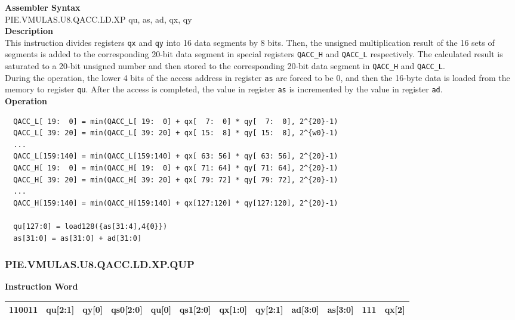 \textbf{Assembler Syntax} \\
PIE.VMULAS.U8.QACC.LD.XP qu, as, ad, qx, qy \\
\textbf{Description} \\
This instruction divides registers \lstinline{qx} and \lstinline{qy} into 16 data segments by 8 bits. Then, the unsigned multiplication result of the 16 sets of segments is added to the corresponding 20-bit data segment in special registers \lstinline{QACC_H} and \lstinline{QACC_L} respectively. The calculated result is saturated to a 20-bit unsigned number and then stored to the corresponding 20-bit data segment in \lstinline{QACC_H} and \lstinline{QACC_L}.\\
During the operation, the lower 4 bits of the access address in register \lstinline{as} are forced to be 0, and then the 16-byte data is loaded from the memory to register \lstinline{qu}. After the access is completed, the value in register \lstinline{as} is incremented by the value in register \lstinline{ad}.\\
\textbf{Operation}
\begin{lstlisting}
  QACC_L[ 19:  0] = min(QACC_L[ 19:  0] + qx[  7:  0] * qy[  7:  0], 2^{20}-1)
  QACC_L[ 39: 20] = min(QACC_L[ 39: 20] + qx[ 15:  8] * qy[ 15:  8], 2^{w0}-1)
  ...
  QACC_L[159:140] = min(QACC_L[159:140] + qx[ 63: 56] * qy[ 63: 56], 2^{20}-1)
  QACC_H[ 19:  0] = min(QACC_H[ 19:  0] + qx[ 71: 64] * qy[ 71: 64], 2^{20}-1)
  QACC_H[ 39: 20] = min(QACC_H[ 39: 20] + qx[ 79: 72] * qy[ 79: 72], 2^{20}-1)
  ...
  QACC_H[159:140] = min(QACC_H[159:140] + qx[127:120] * qy[127:120], 2^{20}-1)

  qu[127:0] = load128({as[31:4],4{0}})
  as[31:0] = as[31:0] + ad[31:0]
\end{lstlisting}

\newpage
\subsubsection{PIE.VMULAS.U8.QACC.LD.XP.QUP}\label{instruction:PIEVMULASU8QACCLDXPQUP}
\setlength\tabcolsep{6pt}
\textbf{Instruction Word} \\
\begin{tabular}{|c|c|c|c|c|c|c|c|c|c|c|c|}
	\hline
	110011 & qu[2:1] & qy[0] & qs0[2:0] & qu[0] & qs1[2:0] & qx[1:0] & qy[2:1] & ad[3:0] & as[3:0] & 111 & qx[2] \\
	\hline
\end{tabular}

